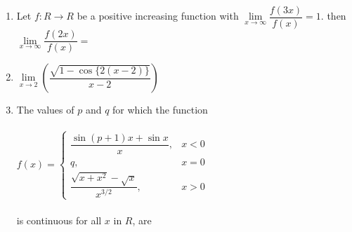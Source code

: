 \begin{enumerate}[label=\arabic*.,ref=\thesubsection.\theenumi]
\item Let $f:R \to R$ be a positive increasing function with $\lim\limits_{x \to \infty}\dfrac{f(3x)}{f(x)}=1$. then $\lim\limits_{x \to \infty}\dfrac{f(2x)}{f(x)}=$
\begin{itemize}
\end{itemize}

\item $\lim\limits_{x \to2}\left(\dfrac{\sqrt{1-\cos\{2(x-2)\}}}{x-2}\right)$
\begin{itemize}
\end{itemize}

\item The values of $p$ and $q$ for which the function\\
\\
$f(x)=\begin{cases}
\dfrac{\sin(p+1)x+\sin x}{x}, &\text{$x<0$}\\
q, &\text{$x=0$}\\
\dfrac{\sqrt{x+x^2}-\sqrt{x}}{x^{3/2}}, & \text{$x>0$}
\end{cases}$ \\
\\is continuous for all $x$ in $R$, are
\begin{itemize}
\end{itemize}


\end{enumerate}
